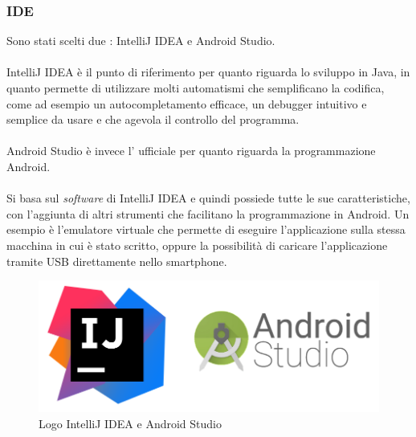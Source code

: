       \subsubsection{IDE}
        Sono stati scelti due : IntelliJ IDEA e Android Studio.\\\\
        IntelliJ IDEA è il punto di riferimento per quanto riguarda lo sviluppo in Java, in quanto permette di utilizzare molti automatismi che semplificano la codifica, come ad esempio un autocompletamento efficace, un debugger intuitivo e semplice da usare e che agevola il controllo del programma.\\\\
        Android Studio è invece l' ufficiale per quanto riguarda la programmazione Android.\\\\
        Si basa sul \textit{software} di IntelliJ IDEA e quindi possiede tutte le sue caratteristiche, con l'aggiunta di altri strumenti che facilitano la programmazione in Android. Un esempio è l'emulatore virtuale che permette di eseguire l'applicazione sulla stessa macchina in cui è stato scritto, oppure la possibilità di caricare l'applicazione tramite USB direttamente nello smartphone.
        \begin{figure}[h]
          \centering
          \includegraphics[scale=0.3]{immagini/ide.png}
          \caption{Logo IntelliJ IDEA e Android Studio}
          \label{logoIntellij}
        \end{figure}
